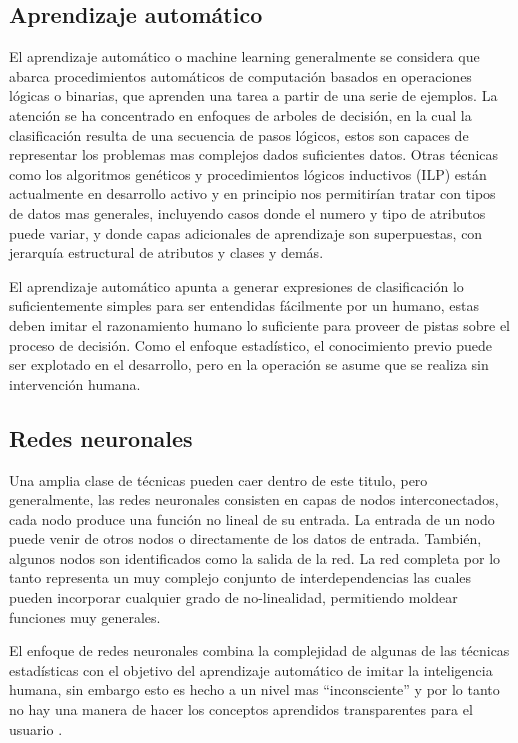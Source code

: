 \subsection{Aprendizaje automático}
El aprendizaje automático o machine learning generalmente se considera que abarca procedimientos automáticos de computación basados en operaciones lógicas o binarias, que aprenden una tarea a partir de una serie de ejemplos.
La atención se ha concentrado en enfoques de arboles de decisión, en la cual la clasificación resulta de una secuencia de pasos lógicos, estos son capaces de representar los problemas mas complejos dados suficientes datos.
Otras técnicas como los algoritmos genéticos y procedimientos lógicos inductivos (ILP) están actualmente en desarrollo activo y en principio nos permitirían tratar con tipos de datos mas generales, incluyendo casos donde el numero y tipo de atributos puede variar, y donde capas adicionales de aprendizaje son superpuestas, con jerarquía estructural de atributos y clases y demás. 

El aprendizaje automático apunta a generar expresiones de clasificación lo suficientemente simples para ser entendidas fácilmente por un humano, estas deben imitar el razonamiento humano lo suficiente para proveer de pistas sobre el proceso de decisión. 
Como el enfoque estadístico, el conocimiento previo puede ser explotado en el desarrollo, pero en la operación se asume que se realiza sin intervención humana.

\subsection{Redes neuronales}
Una amplia clase de técnicas pueden caer dentro de este titulo, pero generalmente, las redes neuronales consisten en capas de nodos interconectados, cada nodo produce una función no lineal de su entrada. La entrada de un nodo puede venir de otros nodos o directamente de los datos de entrada. También, algunos nodos son identificados como la salida de la red. La red completa por lo tanto representa un muy complejo conjunto de interdependencias las cuales pueden incorporar cualquier grado de no-linealidad, permitiendo moldear funciones muy generales.

El enfoque de redes neuronales combina la complejidad de algunas de las técnicas estadísticas con el objetivo del aprendizaje automático de imitar la inteligencia humana, sin embargo esto es hecho a un nivel mas ``inconsciente'' y por lo tanto no hay una manera de hacer los conceptos aprendidos transparentes para el usuario \cite{Michie94machinelearning}.

